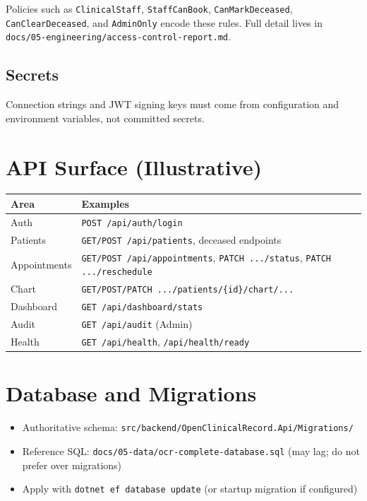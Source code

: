 \documentclass[11pt,a4paper]{article}
\begin{document}
\vspace{0.4em}
\noindent Policies such as \texttt{ClinicalStaff}, \texttt{StaffCanBook}, \texttt{CanMarkDeceased}, \texttt{CanClearDeceased}, and \texttt{AdminOnly} encode these rules. Full detail lives in \texttt{docs/05-engineering/access-control-report.md}.

\subsection{Secrets}
Connection strings and JWT signing keys must come from configuration and environment variables, not committed secrets.

\section{API Surface (Illustrative)}

\begin{tabularx}{\textwidth}{@{}p{3.2cm}X@{}}
\toprule
\textbf{Area} & \textbf{Examples} \\
\midrule
Auth & \texttt{POST /api/auth/login} \\
Patients & \texttt{GET/POST /api/patients}, deceased endpoints \\
Appointments & \texttt{GET/POST /api/appointments}, \texttt{PATCH .../status}, \texttt{PATCH .../reschedule} \\
Chart & \texttt{GET/POST/PATCH .../patients/\{id\}/chart/...} \\
Dashboard & \texttt{GET /api/dashboard/stats} \\
Audit & \texttt{GET /api/audit} (Admin) \\
Health & \texttt{GET /api/health}, \texttt{/api/health/ready} \\
\bottomrule
\end{tabularx}

\section{Database and Migrations}

\begin{itemize}
  \item Authoritative schema: \texttt{src/backend/OpenClinicalRecord.Api/Migrations/}
  \item Reference SQL: \texttt{docs/05-data/ocr-complete-database.sql} (may lag; do not prefer over migrations)
  \item Apply with \texttt{dotnet ef database update} (or startup migration if configured)
\end{itemize}
\end{document}
